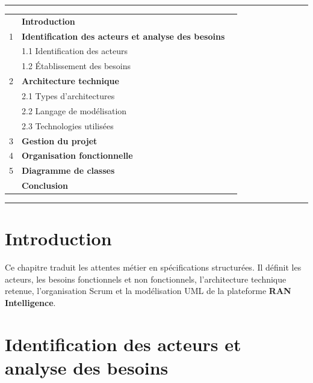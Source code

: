 \documentclass[12pt,a4paper]{report}
\newcommand{\ChapterTOC}[1]{%
\noindent{\large\bfseries Sommaire}\vspace{0.15cm}\par\noindent\rule{\textwidth}{0.55pt}\vspace{0.25cm}%
{\small\renewcommand{\arraystretch}{1.18}#1}\vspace{0.25cm}\par\noindent\rule{\textwidth}{0.55pt}}
\begin{document}
\ChapterTOC{%
\begin{tabular}{@{}p{}p{0.78\textwidth}r@{}}
& \textbf{Introduction}\dotfill & \textbf{\pageref{sec:ch2-intro}} \\
1 & \textbf{Identification des acteurs et analyse des besoins}\dotfill & \textbf{\pageref{sec:ch2-acteurs}} \\
& \hspace{0.45cm}1.1 \quad Identification des acteurs\dotfill & \pageref{sec:ch2-acteurs-id} \\
& \hspace{0.45cm}1.2 \quad Établissement des besoins\dotfill & \pageref{sec:ch2-besoins} \\
2 & \textbf{Architecture technique}\dotfill & \textbf{\pageref{sec:ch2-archi}} \\
& \hspace{0.45cm}2.1 \quad Types d'architectures\dotfill & \pageref{sec:ch2-types} \\
& \hspace{0.45cm}2.2 \quad Langage de modélisation\dotfill & \pageref{sec:ch2-uml} \\
& \hspace{0.45cm}2.3 \quad Technologies utilisées\dotfill & \pageref{sec:ch2-tech} \\
3 & \textbf{Gestion du projet}\dotfill & \textbf{\pageref{sec:ch2-gestion}} \\
4 & \textbf{Organisation fonctionnelle}\dotfill & \textbf{\pageref{sec:ch2-backlog}} \\
5 & \textbf{Diagramme de classes}\dotfill & \textbf{\pageref{sec:ch2-classes}} \\
& \textbf{Conclusion}\dotfill & \textbf{\pageref{sec:ch2-conclusion}} \\
\end{tabular}}

\clearpage
{}

\section*{Introduction}\label{sec:ch2-intro}
Ce chapitre traduit les attentes métier en spécifications structurées. Il définit les acteurs, les besoins fonctionnels et non fonctionnels, l'architecture technique retenue, l'organisation Scrum et la modélisation UML de la plateforme \textbf{RAN Intelligence}.

\section{Identification des acteurs et analyse des besoins}\label{sec:ch2-acteurs}
\end{document}
